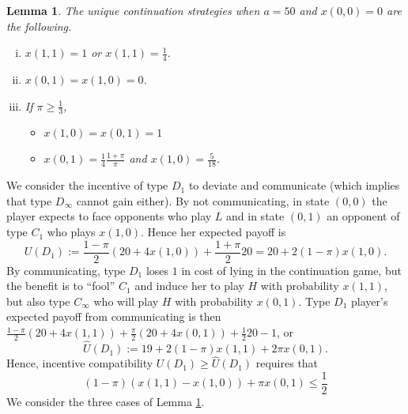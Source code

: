 \documentclass[12pt]{article}
\newtheorem{lemma}{Lemma}
\theoremstyle{definition}
\theoremstyle{remark}
\begin{document}
\begin{lemma}\label{lem:cont-C1}
The unique continuation strategies when $a=50$ and $x(0,0)=0$ are the following.
\begin{enumerate}[(i)]\setlength\itemsep{-0.1em}
    \item $x(1,1)=1$ or $x(1,1)=\frac{1}{4}$.
    \item $x(0,1)=x(1,0)=0$.
    \item If $\pi\geq \frac{1}{3}$,
    \begin{itemize}
        \item $x(1,0)=x(0,1)=1$
        \item $x(0,1)= \frac{1}{4}\frac{1+\pi}{\pi}$ and $x(1,0)=\frac{5}{18}$.
    \end{itemize}
\end{enumerate}
\end{lemma}
%
We consider the incentive of type $D_1$ to deviate and communicate (which implies that type $D_\infty$ cannot gain either). By not communicating, in state $(0,0)$ the player expects to face opponents who play $L$ and in state $(0,1)$ an opponent of type $C_1$ who plays $x(1,0)$. Hence her expected payoff is 
%
\[
U(D_1):=\frac{1-\pi}{2}(20+4x(1,0))+\frac{1+\pi}{2}20=20+2(1-\pi)x(1,0).
\]
By communicating, type $D_1$ loses $1$ in cost of lying in the continuation game, but the benefit is to ``fool'' $C_1$ and induce her to play $H$ with probability $x(1,1)$, but also type $C_\infty$ who will play $H$ with probability $x(0,1)$. Type $D_1$ player's expected payoff from communicating is then $\frac{1-\pi}{2}(20+4x(1,1))+\frac{\pi}{2}(20+4x(0,1))+\frac{1}{2}20 -1$, or
\[
\hat U(D_1):=19+2(1-\pi)x(1,1)+2\pi x(0,1).
\]
Hence, incentive compatibility $U(D_1)\geq \hat U(D_1)$ requires that 
\begin{equation}\label{eq:IC-D1}
    (1-\pi)(x(1,1)-x(1,0))+\pi x(0,1)\leq \frac{1}{2}
\end{equation}
%
We consider the three cases of Lemma \ref{lem:cont-C1}.
\end{document}
